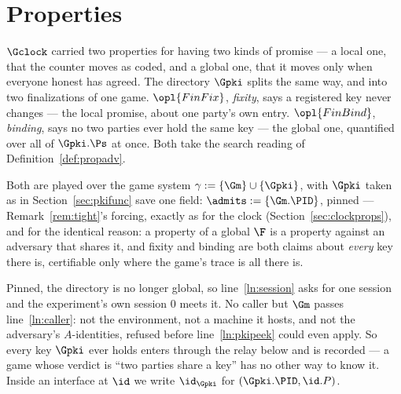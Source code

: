 \documentclass[10pt,oneside,openany]{book}
\theoremstyle{accentdef}
\theoremstyle{accentplain}
\begin{document}
\section{Properties}\label{sec:pkiprops}

$\Gclock$ carried two properties for having two kinds of promise --- a local one, that the counter
moves as coded, and a global one, that it moves only when everyone honest has agreed. The directory $\Gpki$
splits the same way, and into two finalizations of one game. $\opl{FinFix}$, \emph{fixity}, says a
registered key never changes --- the local
promise, about one party's own entry. $\opl{FinBind}$, \emph{binding}, says no two parties ever
hold the same key --- the global one, quantified over all of $\Gpki.\Ps$ at once. Both take the
search reading of Definition~\ref{def:propadv}.

Both are played over the game system $\gamma := \{\Gm\} \cup \{\Gpki\}$, with $\Gpki$ taken as in
Section~\ref{sec:pkifunc} save one field: $\admits := \{\Gm.\PID\}$, pinned --- Remark~\ref{rem:tight}'s
forcing, exactly as for the clock (Section~\ref{sec:clockprops}), and for the identical reason: a
property of a global $\F$ is a property against an adversary that shares it, and fixity and
binding are both claims about \emph{every} key there is, certifiable only where the game's trace
is all there is.

Pinned, the directory is no longer global, so line~\ref{ln:session} asks for one session and the
experiment's own session $0$ meets it. No caller but $\Gm$ passes line~\ref{ln:caller}: not the
environment, not a machine it hosts, and not the adversary's $A$-identities, refused before
line~\ref{ln:pkipeek} could even apply. So every key $\Gpki$ ever holds enters through the relay
below and is recorded --- a game whose verdict is ``two parties share a key'' has no other way to
know it. Inside an interface at $\id$ we write $\id_{\Gpki}$ for $(\Gpki.\PID,\id.P)$.
\end{document}
